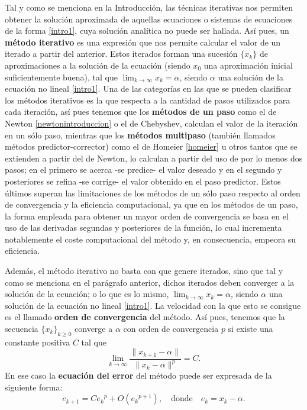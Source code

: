 Tal y como se menciona en la Introducción, las técnicas iterativas nos permiten obtener la solución aproximada de aquellas ecuaciones o sistemas de ecuaciones de la forma \eqref{intro1}, cuya solución analítica no puede ser hallada. Así pues, un \textbf{método iterativo} es una expresión que nos permite calcular el valor de un iterado a partir del anterior. Estos iterados forman una sucesión  $\displaystyle \{x_k\}$ de aproximaciones a la solución de la ecuación (siendo $\displaystyle x_0$ una aproximación inicial suficientemente buena), tal que
$\displaystyle \lim_{k \rightarrow \infty} x_k=\alpha$, siendo $\alpha$ una solución de la ecuación no lineal \eqref{intro1}. Una de las categorías en las que se pueden clasificar los métodos iterativos es la que respecta a la cantidad de pasos utilizados para cada iteración, así pues tenemos que los \textbf{métodos de un paso} como el de Newton \eqref{newtonintroduccion} o el de Chebyshev, calculan el valor de la iteración en un sólo paso, mientras que los \textbf{métodos multipaso} (también llamados métodos predictor-corrector) como el de Homeier \eqref{homeier} u otros tantos que se extienden a partir del de Newton, lo calculan a partir del uso de por lo menos dos pasos; en el primero se acerca -se predice- el valor deseado y en el segundo y posteriores se refina -se corrige- el valor obtenido en el paso predictor. Estos últimos superan las limitaciones de los métodos de un sólo paso respecto al orden de convergencia
y la eficiencia computacional, ya que en los métodos de un paso, la forma empleada para obtener un mayor orden de convergencia se basa en el uso de las derivadas segundas y posteriores de la función, lo cual incrementa notablemente el coste computacional del método y, en consecuencia, empeora su eficiencia.

Además, el método iterativo no basta con que genere iterados, sino que tal y como se menciona en el parágrafo anterior, dichos iterados deben converger a la solución de la ecuación; o lo que es lo mismo, $\displaystyle \lim_{k \rightarrow \infty} x_k=\alpha$, siendo $\alpha$ una solución de la ecuación no lineal \eqref{intro1}. La velocidad con la que esto se consigue es el llamado \textbf{orden de convergencia} del método. Así pues, tenemos que la secuencia $\{x_k\}_{k\geq 0}$ converge a $\alpha$ con orden de convergencia $p$ si existe una constante positiva $C$ tal que
\[
\lim_{k \rightarrow \infty} \frac{\|x_{k+1}-\alpha \|}{\|x_{k}-\alpha \|^p}=C.
\]
En ese caso la \textbf{ecuación del error} del método puede ser expresada de la siguiente forma:
\[
e_{k+1}=C {e_{k}}^p+O({e_{k}}^{p+1}), \quad \mbox{donde} \quad e_{k}=x_{k}-\alpha.
\]

